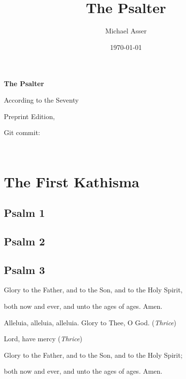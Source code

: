 \documentclass[12pt,openany]{book}
\title{The Psalter}
\author{Michael Asser}
\date{\today}
\newcommand{\kathismabreak}{
  \medskip
  \begin{center}
  \begin{footnotesize}
  Glory to the Father, and to the Son, and to the Holy Spirit,
  
  both now and ever, and unto the ages of ages. Amen.

  Alleluia, alleluia, alleluia. Glory to Thee, O God. (\textit{Thrice})

  Lord, have mercy (\textit{Thrice})

  Glory to the Father, and to the Son, and to the Holy Spirit;
  
  both now and ever, and unto the ages of ages. Amen.
  \end{footnotesize}
  \end{center}
  \smallbreak
}
\begin{document}
\begin{titlepage}
  \begin{center}
  \vspace*{2in}

  \begin{Huge}
  \textbf{The Psalter}
  \end{Huge}

  \vspace{0.25in}
  \begin{small}
  According to the Seventy
  \end{small}

  \vfill

  \end{center}
\end{titlepage}

\newpage

\thispagestyle{empty}
\begin{center}
\vspace*{2in}
Preprint Edition, 

Git commit: 
\end{center}

\newpage

\thispagestyle{empty}
\ %

\newpage


\chapter*{The First Kathisma}
\smallskip

\section{Psalm 1}

\smallskip
\section{Psalm 2}

\smallskip
\section{Psalm 3}


\kathismabreak
\smallskip

\pagebreak %
\end{document}
